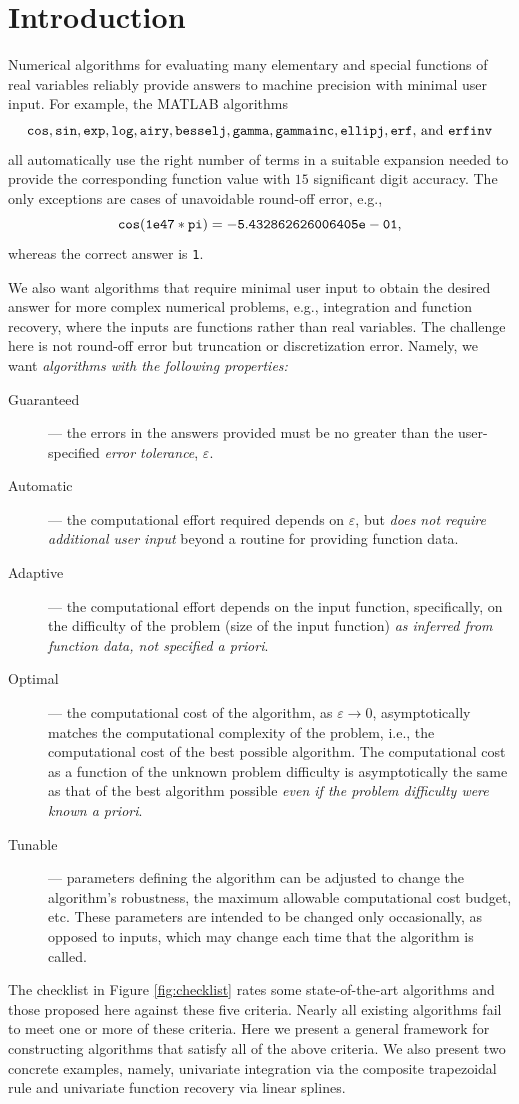 \documentclass[]{elsarticle}
\theoremstyle{definition}
\theoremstyle{remark}
\begin{document}
\section{Introduction}

Numerical algorithms for evaluating many elementary and special functions of real variables reliably provide answers to machine precision with minimal user input.  For example, the MATLAB \cite{MAT7.12} algorithms
\[
{\tt cos, sin, exp, log, airy, besselj, gamma, gammainc, ellipj, erf,} \text{ and } {\tt  erfinv}
\] 
all automatically use the right number of terms in a suitable expansion needed to provide the corresponding function value with $15$ significant digit accuracy. The only exceptions are cases of unavoidable round-off error, e.g., 
\[
{\tt cos(1e47*pi)= -5.432862626006405e-01},
\]
whereas the correct answer is {\tt 1}.

We also want algorithms that require minimal user input to obtain the desired answer for more complex numerical problems, e.g., integration and function recovery, where the inputs are functions rather than real variables.  The challenge here is not round-off error but truncation or discretization error.  Namely, we want \emph{algorithms with the following properties:}
\begin{description}
\item[Guaranteed]--- the errors in the answers provided must be no greater than the user-specified \emph{error tolerance}, $\varepsilon$.
\item[Automatic]--- the computational effort required depends on $\varepsilon$, but \emph{does not require additional user input} beyond a routine for providing function data.
\item[Adaptive]--- the computational effort depends on the input function, specifically, on the difficulty of the problem (size of the input function) \emph{as inferred from function data, not specified a priori}.
\item[Optimal]--- the computational cost of the algorithm, as $\varepsilon \to 0$, asymptotically matches the computational complexity of the problem, i.e., the computational cost of the best possible algorithm.  The computational cost as a function of the unknown problem difficulty is asymptotically the same as that of the best algorithm possible \emph{even if the problem difficulty were known a priori}.
\item[Tunable]--- parameters defining the algorithm can be adjusted to change the algorithm's robustness, the maximum allowable computational cost budget, etc.  These parameters are intended to be changed only occasionally, as opposed to inputs, which may change each time that the algorithm is called.
\end{description}
The checklist in Figure \ref{fig:checklist} rates some state-of-the-art algorithms and those proposed here against these five criteria.  Nearly all existing algorithms fail to meet one or more of these criteria.  Here we present a general framework for constructing algorithms that satisfy all of the above criteria.  We also present two concrete examples, namely, univariate integration via the composite trapezoidal rule and univariate function recovery via linear splines.
\end{document}
